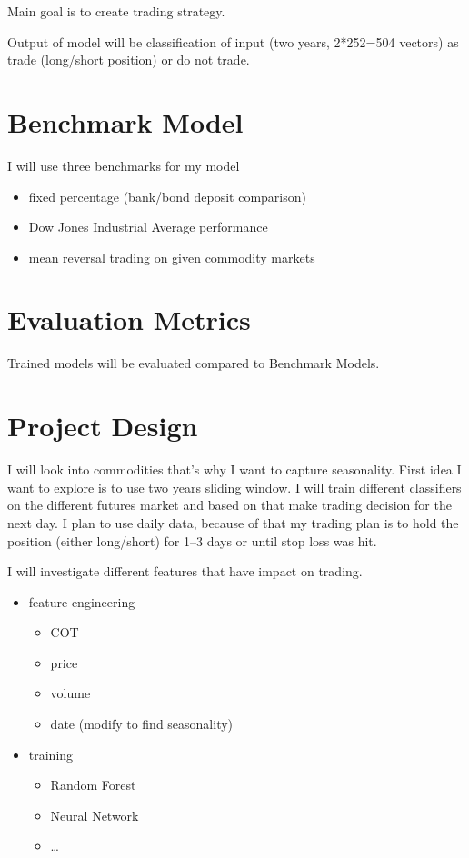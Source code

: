 \documentclass[final,2p]{elsarticle}
\begin{document}
Main goal is to create trading strategy.

Output of model will be classification of input (two years, 2*252=504 vectors) as trade (long/short position) or do not trade.

\section{Benchmark Model}

I will use three benchmarks for my model

\begin{itemize}
    \item fixed percentage (bank/bond deposit comparison)
    \item Dow Jones Industrial Average performance
    \item mean reversal trading on given commodity markets
\end{itemize}

\section{Evaluation Metrics}

Trained models will be evaluated compared to Benchmark Models.

\section{Project Design}

I will look into commodities that's why I want to capture seasonality.
First idea I want to explore is to use two years sliding window. I will train different classifiers on the different futures market and 
based on that make trading decision for the next day. I plan to use daily data, because of that my trading plan is to hold the position (either long/short) for 1--3 days or until stop loss was hit.

I will investigate different features that have impact on trading.

\begin{itemize}
    \item feature engineering
    \begin{itemize}
        \item COT
        \item price
        \item volume
        \item date (modify to find seasonality)
    \end{itemize}
    \item training
    \begin{itemize}
        \item Random Forest
        \item Neural Network
        \item \ldots
    \end{itemize}
\end{itemize}
\end{document}

